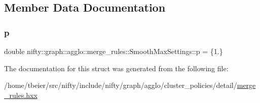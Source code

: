 \subsection{Member Data Documentation}
\mbox{\label{structnifty_1_1graph_1_1agglo_1_1merge__rules_1_1SmoothMaxSettings_a42d3519eae9e6ada7012008b04e3167a}} 
\subsubsection{\texorpdfstring{p}{p}}
{\footnotesize\ttfamily double nifty\+::graph\+::agglo\+::merge\+\_\+rules\+::\+Smooth\+Max\+Settings\+::p = \{1.\}}



The documentation for this struct was generated from the following file\+:\begin{DoxyCompactItemize}
\item 
/home/tbeier/src/nifty/include/nifty/graph/agglo/cluster\+\_\+policies/detail/\hyperlink{merge__rules_8hxx}{merge\+\_\+rules.\+hxx}\end{DoxyCompactItemize}

